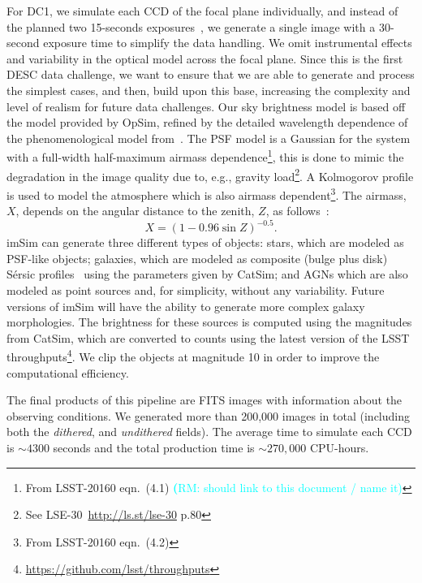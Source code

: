 \documentclass[twocolumn]{aastex62}
\newcommand{\rachel}[1]{{\textcolor{cyan}{{\textbf (RM: #1)}}}}
\begin{document}
For DC1, we simulate each CCD of the focal plane individually, and instead of the planned two 15-seconds exposures~\citep{Overview}, we generate a single image with a 30-second exposure time to simplify the data handling. We omit instrumental effects and variability in the optical model across the focal plane. Since this is the first DESC data challenge, we want to ensure that we are able to generate and process the simplest cases, and then, build upon this base, increasing the complexity and level of realism for future data challenges. Our sky brightness model is based off the \citet{1991PASP..103.1033K} model provided by OpSim, refined by the detailed wavelength dependence of the phenomenological model from~\citet{2016SPIE.9910E..1AY}. The PSF model is a Gaussian for the system with a full-width half-maximum airmass dependence\footnote{From LSST-20160 eqn.~(4.1) \rachel{should link to this document / name it}}, this is done to mimic the degradation in the image quality due to, e.g., gravity load\footnote{See LSE-30~\url{http://ls.st/lse-30} p.80}. A Kolmogorov profile is used to model the atmosphere which is also airmass dependent\footnote{From LSST-20160 eqn.~(4.2)}. The airmass, $X$, depends on the angular distance to the zenith, $Z$, as follows~\citep{1991PASP..103.1033K}:
\begin{equation}
X = (1 - 0.96\sin{Z})^{-0.5}.
\end{equation}
imSim can generate three different types of objects: stars, which are modeled as PSF-like objects; galaxies, which are modeled as composite (bulge plus disk) S\'{e}rsic profiles~\citep{1963BAAA....6...41S} using
the parameters given by CatSim; and AGNs which are also modeled as point sources and, for simplicity, without any variability. Future versions of imSim will have the ability to generate more complex galaxy morphologies. The brightness for these sources is computed using the magnitudes from CatSim, which are converted to counts using the latest version of the LSST throughputs\footnote{\url{https://github.com/lsst/throughputs}}. We clip the objects at magnitude 10 in order to improve the computational efficiency.

The final products of this pipeline are FITS images with information about the observing conditions. We generated more than 200,000 images in total (including both the \textit{dithered}, and \textit{undithered} fields). The average time to simulate each CCD is $\sim 4300$ seconds and the total production time is $\sim 270,000$ CPU-hours.

\end{document}
